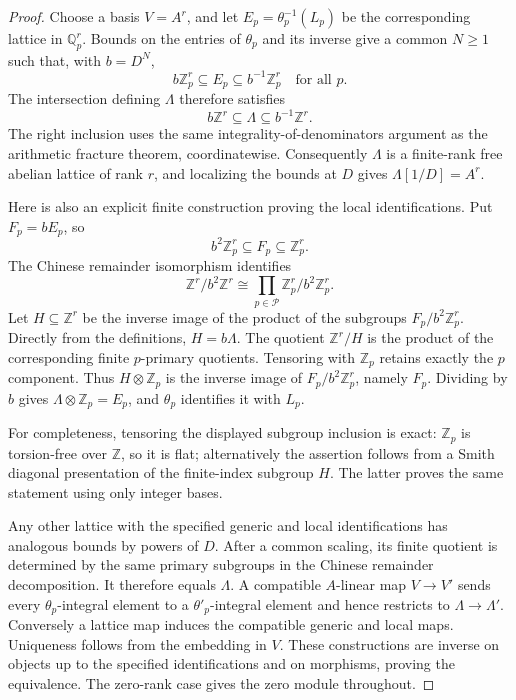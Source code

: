 \documentclass[11pt]{article}
\theoremstyle{definition}
\theoremstyle{remark}
\begin{document}
\begin{proof}
Choose a basis $V=A^r$, and let $E_p=\theta_p^{-1}(L_p)$ be the corresponding lattice in $\mathbb Q_p^r$. Bounds on the entries of $\theta_p$ and its inverse give a common $N\geq1$ such that, with $b=D^N$,
\[
 b\mathbb Z_p^r\subseteq E_p\subseteq b^{-1}\mathbb Z_p^r
 \quad\text{for all }p.
\]
The intersection defining $\Lambda$ therefore satisfies
\[
 b\mathbb Z^r\subseteq\Lambda\subseteq b^{-1}\mathbb Z^r.
\]
The right inclusion uses the same integrality-of-denominators argument as the arithmetic fracture theorem, coordinatewise. Consequently $\Lambda$ is a finite-rank free abelian lattice of rank $r$, and localizing the bounds at $D$ gives $\Lambda[1/D]=A^r$.

Here is also an explicit finite construction proving the local identifications. Put $F_p=bE_p$, so
\[
 b^2\mathbb Z_p^r\subseteq F_p\subseteq\mathbb Z_p^r.
\]
The Chinese remainder isomorphism identifies
\[
 \mathbb Z^r/b^2\mathbb Z^r\cong
 \prod_{p\in\mathcal P}\mathbb Z_p^r/b^2\mathbb Z_p^r.
\]
Let $H\subseteq\mathbb Z^r$ be the inverse image of the product of the subgroups $F_p/b^2\mathbb Z_p^r$. Directly from the definitions, $H=b\Lambda$. The quotient $\mathbb Z^r/H$ is the product of the corresponding finite $p$-primary quotients. Tensoring with $\mathbb Z_p$ retains exactly the $p$ component. Thus $H\otimes\mathbb Z_p$ is the inverse image of $F_p/b^2\mathbb Z_p^r$, namely $F_p$. Dividing by $b$ gives $\Lambda\otimes\mathbb Z_p=E_p$, and $\theta_p$ identifies it with $L_p$.

For completeness, tensoring the displayed subgroup inclusion is exact: $\mathbb Z_p$ is torsion-free over $\mathbb Z$, so it is flat; alternatively the assertion follows from a Smith diagonal presentation of the finite-index subgroup $H$. The latter proves the same statement using only integer bases.

Any other lattice with the specified generic and local identifications has analogous bounds by powers of $D$. After a common scaling, its finite quotient is determined by the same primary subgroups in the Chinese remainder decomposition. It therefore equals $\Lambda$. A compatible $A$-linear map $V\to V'$ sends every $\theta_p$-integral element to a $\theta'_p$-integral element and hence restricts to $\Lambda\to\Lambda'$. Conversely a lattice map induces the compatible generic and local maps. Uniqueness follows from the embedding in $V$. These constructions are inverse on objects up to the specified identifications and on morphisms, proving the equivalence. The zero-rank case gives the zero module throughout.
\end{proof}
\end{document}

